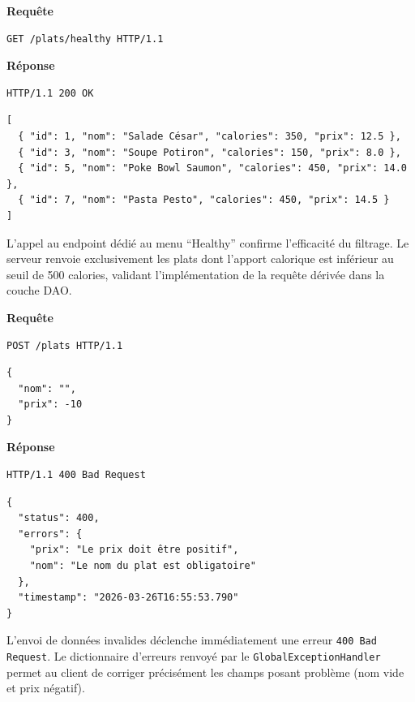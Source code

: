 \documentclass[12pt,a4paper,french]{article}
\begin{document}
\begin{tcolorbox}[projectbox, title=Test : Recherche Métier Healthy (Calories < 500)]
    \small\textbf{Requête}
    \begin{verbatim}
GET /plats/healthy HTTP/1.1
\end{verbatim}
    \small\textbf{Réponse}
    \begin{verbatim}
HTTP/1.1 200 OK
\end{verbatim}
    \begin{verbatim}
[
  { "id": 1, "nom": "Salade César", "calories": 350, "prix": 12.5 },
  { "id": 3, "nom": "Soupe Potiron", "calories": 150, "prix": 8.0 },
  { "id": 5, "nom": "Poke Bowl Saumon", "calories": 450, "prix": 14.0 },
  { "id": 7, "nom": "Pasta Pesto", "calories": 450, "prix": 14.5 }
]
\end{verbatim}
\end{tcolorbox}
L'appel au endpoint dédié au menu ``Healthy'' confirme l'efficacité du filtrage. Le serveur
renvoie exclusivement les plats dont l'apport calorique est inférieur au seuil de 500 calories,
validant l'implémentation de la requête dérivée dans la couche DAO.

\begin{tcolorbox}[projectbox, title=Test : Validation des Données (Erreur 400)]
    \small\textbf{Requête}
    \begin{verbatim}
POST /plats HTTP/1.1
\end{verbatim}
    \begin{verbatim}
{ 
  "nom": "", 
  "prix": -10 
}
\end{verbatim}
    \small\textbf{Réponse}
    \begin{verbatim}
HTTP/1.1 400 Bad Request
\end{verbatim}
    \begin{verbatim}
{
  "status": 400,
  "errors": {
    "prix": "Le prix doit être positif",
    "nom": "Le nom du plat est obligatoire"
  },
  "timestamp": "2026-03-26T16:55:53.790"
}
\end{verbatim}
\end{tcolorbox}
L'envoi de données invalides déclenche immédiatement une erreur \texttt{400 Bad Request}.
Le dictionnaire d'erreurs renvoyé par le \texttt{GlobalExceptionHandler} permet
au client de corriger précisément les champs posant problème (nom vide et prix négatif).
\end{document}
